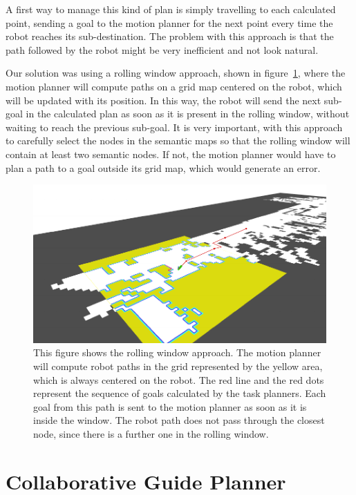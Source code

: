A first way to manage this kind of plan is simply travelling to each calculated point, sending a goal to the motion planner for the next point every time the robot reaches its sub-destination. The problem with this approach is that the path followed by the robot might be very inefficient and not look natural.

Our solution was using a rolling window approach, shown in figure~\ref{fig:case_study-spencer-rolling_window}, where the motion planner will compute paths on a grid map centered on the robot, which will be updated with its position. In this way, the robot will send the next sub-goal in the calculated plan as soon as it is present in the rolling window, without waiting to reach the previous sub-goal. It is very important, with this approach to carefully select the nodes in the semantic maps so that the rolling window will contain at least two semantic nodes. If not, the motion planner would have to plan a path to a goal outside its grid map, which would generate an error.


\begin{figure}[ht!]
	\centering
	\includegraphics[]{img/case_study/spencer/rolling_window.pdf}
	\caption[Rolling window]{This figure shows the rolling window approach. The motion planner will compute robot paths in the grid represented by the yellow area, which is always centered on the robot. The red line and the red dots represent the sequence of goals calculated by the task planners. Each goal from this path is sent to the motion planner as soon as it is inside the window. The robot path does not pass through the closest node, since there is a further one in the rolling window.}
	\label{fig:case_study-spencer-rolling_window}
\end{figure}

\section{Collaborative Guide Planner }
\label{sec:spencer-collaborative_guide_planner}

